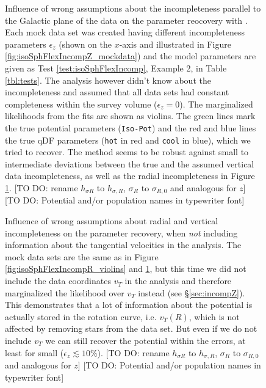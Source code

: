 \addtocounter{figure}{-1}
\begin{figure} [t!]
\caption{Influence of wrong assumptions about the incompleteness parallel to the Galactic plane of the data on the parameter reocovery with \RM. Each mock data set was created having different incompleteness parameters $\epsilon_z$ (shown on the $x$-axis and illustrated in Figure \ref{fig:isoSphFlexIncompZ_mockdata}) and the model parameters are given as Test \ref{test:isoSphFlexIncomp}, Example 2, in Table \ref{tbl:tests}. The analysis however didn't know about the incompleteness and assumed that all data sets had constant completeness within the survey volume ($\epsilon_z = 0$). The marginalized likelihoods from the fits are shown as violins. The green lines mark the true potential parameters (\texttt{Iso-Pot}) and the red and blue lines the true qDF parameters (\texttt{hot} \MAP{} in red and \texttt{cool} \MAP{} in blue), which we tried to recover. The \RM method seems to be robust against small to intermediate deviations between the true and the assumed vertical data incompleteness, as well as the radial incompleteness in Figure \ref{fig:isoSphFlexIncompZ_violins}. [TO DO: rename $h_{\sigma R}$ to $h_{\sigma,R}$, $\sigma_R$ to $\sigma_{R,0}$ and analogous for $z$] [TO DO: Potential and/or population names in typewriter font]} 
\label{fig:isoSphFlexIncompZ_violins}
\end{figure}

\begin{figure}
\caption{Influence of wrong assumptions about radial and vertical incompleteness on the parameter recovery, when \emph{not} including information about the tangential velocities in the analysis. The mock data sets are the same as in Figure \ref{fig:isoSphFlexIncompR_violins} and \ref{fig:isoSphFlexIncompZ_violins}, but this time we did not include the data coordinates $v_T$ in the analysis and therefore marginalized the likelihood over $v_T$ instead (see \S\ref{sec:incompZ}). This demonstrates that a lot of information about the potential is actually stored in the rotation curve, i.e. $v_T(R)$, which is not affected by removing stars from the data set. But even if we do not include $v_T$ we can still recover the potential within the errors, at least for small ($\epsilon_z \lesssim 10\%$). [TO DO: rename $h_{\sigma R}$ to $h_{\sigma,R}$, $\sigma_R$ to $\sigma_{R,0}$ and analogous for $z$] [TO DO: Potential and/or population names in typewriter font]} 
\label{fig:isoSphFlexIncomp_marginal_violins}
\end{figure}
